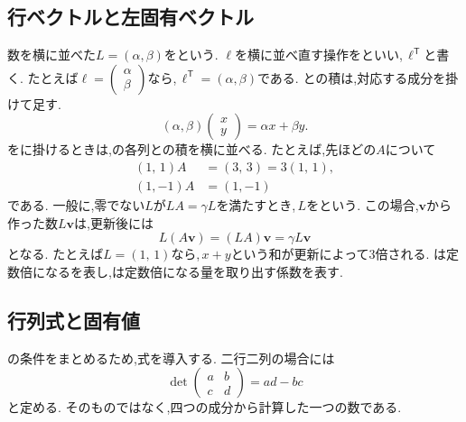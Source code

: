\subsection{行ベクトルと左固有ベクトル}

数を横に並べた$L=(\alpha,\beta)$を\textbf{}という.
$\boldsymbol{\ell}$を横に並べ直す操作を\textbf{}といい,\,$\boldsymbol{\ell}^{\mathsf T}$と書く.
たとえば$\boldsymbol{\ell}=\begin{pmatrix}\alpha\\\beta\end{pmatrix}$なら,\,$\boldsymbol{\ell}^{\mathsf T}=(\alpha,\beta)$である.
との積は,対応する成分を掛けて足す.
\[
  (\alpha,\beta)\begin{pmatrix}x\\y\end{pmatrix}
  =\alpha x+\beta y.
\]
をに掛けるときは,の各列との積を横に並べる.
たとえば,先ほどの$A$について
\[
  \begin{aligned}
    (1,\,1)A&=(3,\,3)=3(1,\,1),\\
    (1,-1)A&=(1,-1)
  \end{aligned}
\]
である.
一般に,零でない$L$が$LA=\gamma L$を満たすとき,\,$L$を\textbf{}という.
この場合,$\boldsymbol{v}$から作った数$L\boldsymbol{v}$は,更新後には
\[
  L(A\boldsymbol{v})=(LA)\boldsymbol{v}
  =\gamma L\boldsymbol{v}
\]
となる.
たとえば$L=(1,\,1)$なら,\,$x+y$という和が更新によって$3$倍される.
は定数倍になるを表し,は定数倍になる量を取り出す係数を表す.

\subsection{行列式と固有値}

の条件をまとめるため,式を導入する.
二行二列の場合には
\[
  \det\begin{pmatrix}a&b\\c&d\end{pmatrix}=ad-bc
\]
と定める.
そのものではなく,四つの成分から計算した一つの数である.

